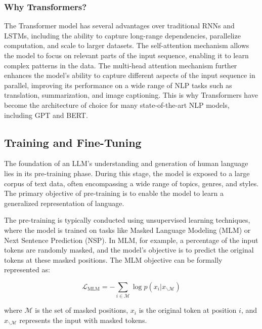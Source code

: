                 
                \subsubsection{Why Transformers?}
                The Transformer model has several advantages over traditional RNNs and LSTMs, including the ability to capture long-range dependencies, parallelize computation, and scale to larger datasets. The self-attention mechanism allows the model to focus on relevant parts of the input sequence, enabling it to learn complex patterns in the data. The multi-head attention mechanism further enhances the model's ability to capture different aspects of the input sequence in parallel, improving its performance on a wide range of NLP tasks such as translation, summarization, and image captioning. This is why Transformers have become the architecture of choice for many state-of-the-art NLP models, including GPT and BERT.

            \subsection{Training and Fine-Tuning}
            The foundation of an LLM's understanding and generation of human language lies in its pre-training phase. During this stage, the model is exposed to a large corpus of text data, often encompassing a wide range of topics, genres, and styles. The primary objective of pre-training is to enable the model to learn a generalized representation of language.
            
            The pre-training is typically conducted using unsupervised learning techniques, where the model is trained on tasks like Masked Language Modeling (MLM) or Next Sentence Prediction (NSP). In MLM, for example, a percentage of the input tokens are randomly masked, and the model's objective is to predict the original tokens at these masked positions. The MLM objective can be formally represented as:
            
            \begin{equation}
            \mathcal{L}_{\text{MLM}} = -\sum_{i \in \mathcal{M}} \log p(x_i | x_{\backslash \mathcal{M}})
            \end{equation}
            
            where $\mathcal{M}$ is the set of masked positions, $x_i$ is the original token at position $i$, and $x_{\backslash \mathcal{M}}$ represents the input with masked tokens.
            \vspace*{0.2cm}

